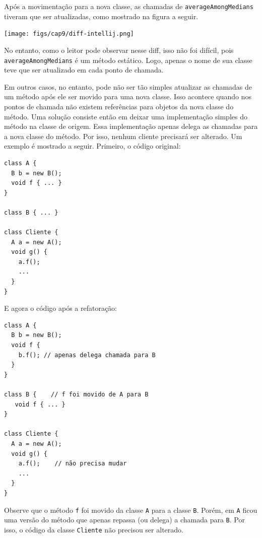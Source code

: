\documentclass[
  11pt,
  twoside]{book}
\newcommand{\passthrough}[1]{#1}
\let\origfigure\figure
\let\endorigfigure\endfigure
\renewenvironment{figure}[1][2] {
    \expandafter\origfigure\expandafter[!h]
} {
    \endorigfigure
}
\begin{document}
Após a movimentação para a nova classe, as chamadas de
\passthrough{\lstinline!averageAmongMedians!} tiveram que ser
atualizadas, como mostrado na figura a seguir.

\begin{figure}
\centering
\texttt{[image: figs/cap9/diff-intellij.png]}
\caption{Atualizando chamadas de método estático após movimentação.
\passthrough{\lstinline!averageAmongMedians!} foi movido de
\passthrough{\lstinline!PlatformTestUtil!} para
\passthrough{\lstinline!ArrayUtil!}.}
\end{figure}

No entanto, como o leitor pode observar nesse diff, isso não foi
difícil, pois \passthrough{\lstinline!averageAmongMedians!} é um método
estático. Logo, apenas o nome de sua classe teve que ser atualizado em
cada ponto de chamada.

Em outros casos, no entanto, pode não ser tão simples atualizar as
chamadas de um método após ele ser movido para uma nova classe. Isso
acontece quando nos pontos de chamada não existem referências para
objetos da nova classe do método. Uma solução consiste então em deixar
uma implementação simples do método na classe de origem. Essa
implementação apenas delega as chamadas para a nova classe do método.
Por isso, nenhum cliente precisará ser alterado. Um exemplo é mostrado a
seguir. Primeiro, o código original:

\begin{lstlisting}
class A {
  B b = new B();
  void f { ... }
}

class B { ... }

class Cliente {
  A a = new A();
  void g() {
    a.f(); 
    ...
  }
}
\end{lstlisting}

E agora o código após a refatoração:

\begin{lstlisting}
class A {
  B b = new B();
  void f {
    b.f(); // apenas delega chamada para B
  }
}

class B {    // f foi movido de A para B
   void f { ... }
}

class Cliente {
  A a = new A();
  void g() { 
    a.f();    // não precisa mudar
    ...
  }
}
\end{lstlisting}

Observe que o método \passthrough{\lstinline!f!} foi movido da classe
\passthrough{\lstinline!A!} para a classe \passthrough{\lstinline!B!}.
Porém, em \passthrough{\lstinline!A!} ficou uma versão do método que
apenas repassa (ou delega) a chamada para \passthrough{\lstinline!B!}.
Por isso, o código da classe \passthrough{\lstinline!Cliente!} não
precisou ser alterado.
\end{document}
